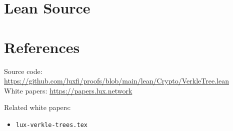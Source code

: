 \documentclass[11pt]{article}
\begin{document}
\section{Lean Source}


\section{References}
\noindent Source code: \url{https://github.com/luxfi/proofs/blob/main/lean/Crypto/VerkleTree.lean}\\
\noindent White papers: \url{https://papers.lux.network}

\noindent Related white papers:
\begin{itemize}
  \item \texttt{lux-verkle-trees.tex}
\end{itemize}
\end{document}
